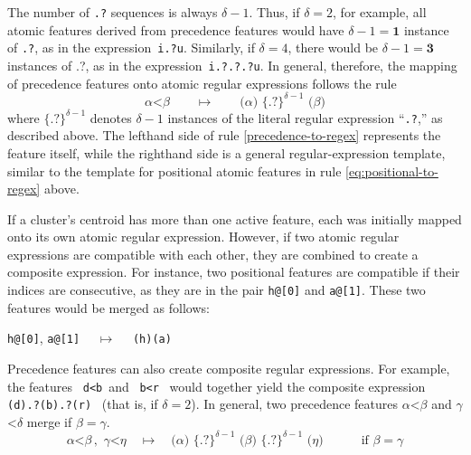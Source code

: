 {The number of \texttt{.?} sequences is always $\delta - 1$. Thus, if $\delta = 2$, for example, all atomic
features derived from precedence features would have $\delta - 1 \mathbf{= 1}$ 
instance of \texttt{.?}, as in the expression \,\texttt{i.?u}.
Similarly, if $\delta = 4$, there would be $\delta - 1 \mathbf{= 3}$ instances 
of {.?}, as in the expression \,\texttt{i.?.?.?u}. %
In general, therefore, the mapping of precedence features onto atomic regular expressions 
follows the rule
\begin{equation}\label{precedence-to-regex}
\alpha\text{<}\beta \qquad \mapsto \qquad \texttt{(}\alpha \texttt{)}\,\, {\{\texttt{.?}\}}^{\delta-1} \,\, \texttt{(} \beta \texttt{)}
\end{equation}
where ${\{\texttt{.?}\}}^{\delta-1}$ denotes ${\delta-1}$ instances of the literal regular expression ``\texttt{.?},'' as described above. 
The lefthand side of rule \eqref{precedence-to-regex} represents the feature itself, while the righthand side is a general regular-expression template, similar to the template for positional atomic features in rule \eqref{eq:positional-to-regex} above.

If a cluster's centroid has more than one active feature, each
was initially mapped onto its own atomic regular expression.
However, if two atomic regular expressions are compatible with each other, 
they are combined to create a composite expression. For instance, two 
positional features are compatible if their indices are consecutive, 
as they are in the pair \texttt{h@[0]} and \texttt{a@[1]}. These two features would be
merged as follows:
\begin{center}
\texttt{h@[0]}, \texttt{a@[1]} $\quad \mapsto \quad$ \texttt{(h)(a)}
\end{center}
Precedence features 
can also create composite regular expressions. For example, the 
features \, \texttt{d<b}\,  and \, \texttt{b<r} \, would together yield the 
composite expression \, \texttt{(d).?(b).?(r)} \, (that is, if $\delta = 2$). 
In general, two precedence features $\alpha$<$\beta$ and $\gamma$<$\delta$
merge if $\beta=\gamma$.
\begin{equation}
\alpha\texttt{<} \beta \, ,\,\, \gamma \texttt{<} \eta  \quad \mapsto \quad \texttt{(} \alpha \texttt{)}  \,\, 
{\{\texttt{.?}\}}^{\delta-1} \,\, \texttt{(}\beta \texttt{)} \,\,{\{\texttt{.?}\}}^{\delta-1} \, \, \texttt{(} \eta \texttt{)} \qquad \quad \text{if $\beta = \gamma$} 
\end{equation}

}
